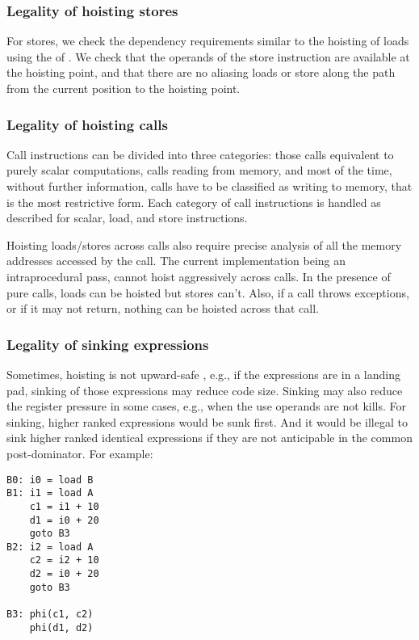 \documentclass[acmlarge,review,anonymous]{acmart}\settopmatter{printfolios=true}
\begin{document}
\subsubsection{Legality of hoisting stores}
For stores, we check the dependency requirements similar to the hoisting of
loads using the \MemorySSA{} of \LLVM{}. We check that the operands of the store
instruction are available at the hoisting point, and that there are no aliasing
loads or store along the path from the current position to the hoisting point.

\subsubsection{Legality of hoisting calls}
Call instructions can be divided into three categories: those calls equivalent
to purely scalar computations, calls reading from memory, and most of the time,
without further information, calls have to be classified as writing to memory,
that is the most restrictive form.  Each category of call instructions is
handled as described for scalar, load, and store instructions.

Hoisting loads/stores across calls also require precise analysis of all the
memory addresses accessed by the call. The current implementation being an
intraprocedural pass, cannot hoist aggressively across calls. In the presence of
pure calls, loads can be hoisted but stores can't. Also, if a call throws
exceptions, or if it may not return, nothing can be hoisted across that call.

\subsubsection{Legality of sinking expressions}
Sometimes, hoisting is not upward-safe \cite{click1995global}, e.g., if the
expressions are in a landing pad, sinking of those expressions
may reduce code size. Sinking may also reduce the register pressure in some
cases, e.g., when the use operands are not kills. For sinking, higher ranked
expressions would be sunk first. And it would be illegal to sink higher ranked
identical expressions if they are not anticipable in the common
post-dominator. For example:

\begin{verbatim}
B0: i0 = load B
B1: i1 = load A
    c1 = i1 + 10
    d1 = i0 + 20
    goto B3
B2: i2 = load A
    c2 = i2 + 10
    d2 = i0 + 20
    goto B3

B3: phi(c1, c2)
    phi(d1, d2)
\end{verbatim}
\end{document}

